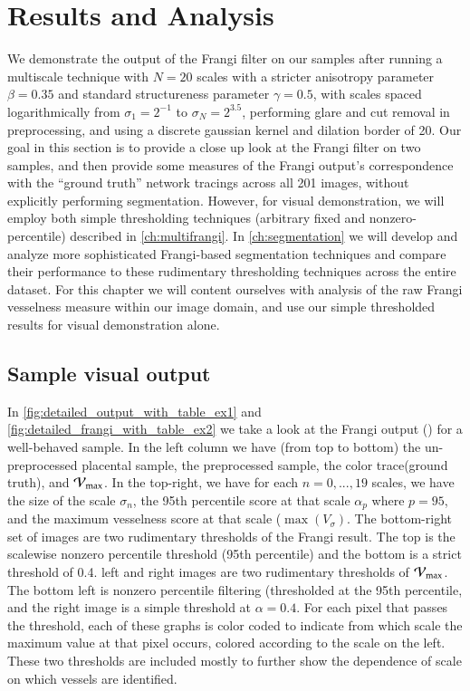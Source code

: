 \chapter{Results and Analysis} \label{ch:results-analysis}

We demonstrate the output of the Frangi filter on our samples after running a multiscale technique with $N=20$ scales with a stricter anisotropy parameter $\beta = 0.35$ and standard structureness parameter $\gamma=0.5$,
with scales spaced logarithmically from $\sigma_1 = 2^{-1}$ to $\sigma_N = 2^{3.5}$, performing glare and cut removal in preprocessing, and using a discrete gaussian kernel and dilation border of 20.
Our goal in this section is to provide a close up look at the Frangi filter on two samples, and then provide some measures of the Frangi output's correspondence with the ``ground truth'' network tracings across all 201 images, without explicitly performing segmentation. However, for visual demonstration, we will employ both simple thresholding techniques (arbitrary fixed and nonzero-percentile) described in \cref{ch:multifrangi}. In \cref{ch:segmentation} we will develop and analyze more sophisticated Frangi-based segmentation techniques and compare their performance to these rudimentary thresholding techniques across the entire dataset. For this chapter we will content ourselves with analysis of the raw Frangi vesselness measure within our image domain, and use our simple thresholded results for visual demonstration alone.

\section{Sample visual output}
In \cref{fig:detailed_output_with_table_ex1} and \cref{fig:detailed_frangi_with_table_ex2} we take a look at the Frangi output (\Vmax) for a well-behaved sample. In the left column we have (from top to bottom) the un-preprocessed placental sample, the preprocessed sample, the color trace(ground truth), and $\mathcal{V}_{\max}$. In the top-right, we have for each $n=0,...,19$ scales, we have the size of the scale $\sigma_n$, the 95th percentile score at that scale  $\alpha_p$ where $p=95$, and the maximum vesselness score at that scale ($\max(V_\sigma)$. The bottom-right set of images are two rudimentary thresholds of the Frangi result. The top is the scalewise nonzero percentile threshold (95th percentile) and the bottom is a strict threshold of 0.4. left and right images are two rudimentary thresholds of $\mathcal{V}_{\max}$. The bottom left is nonzero percentile filtering (thresholded at the 95th percentile, and the  right image is a simple threshold at $\alpha=0.4$. For each pixel that passes the threshold, each of these graphs is color coded to indicate from which scale the maximum value at that pixel occurs, colored according to the scale on the left. These two thresholds are included mostly to further show the dependence of scale on which vessels are identified.

